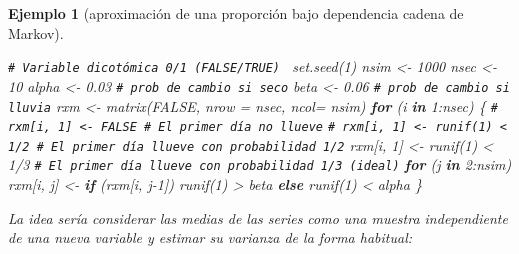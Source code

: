 \documentclass[
  10pt,
]{book}
\newenvironment{Shaded}{\begin{snugshade}}{\end{snugshade}}
\newcommand{\AttributeTok}[1]{\textcolor[rgb]{0.77,0.63,0.00}{#1}}
\newcommand{\CommentTok}[1]{\textcolor[rgb]{0.56,0.35,0.01}{\textit{#1}}}
\newcommand{\ConstantTok}[1]{\textcolor[rgb]{0.00,0.00,0.00}{#1}}
\newcommand{\ControlFlowTok}[1]{\textcolor[rgb]{0.13,0.29,0.53}{\textbf{#1}}}
\newcommand{\DecValTok}[1]{\textcolor[rgb]{0.00,0.00,0.81}{#1}}
\newcommand{\FloatTok}[1]{\textcolor[rgb]{0.00,0.00,0.81}{#1}}
\newcommand{\FunctionTok}[1]{\textcolor[rgb]{0.00,0.00,0.00}{#1}}
\newcommand{\NormalTok}[1]{#1}
\newcommand{\OtherTok}[1]{\textcolor[rgb]{0.56,0.35,0.01}{#1}}
\newcommand{\SpecialCharTok}[1]{\textcolor[rgb]{0.00,0.00,0.00}{#1}}
\theoremstyle{break}
\newtheorem{example}{Ejemplo}[chapter]
\theoremstyle{nonumberplain}
\renewcommand{\CommentTok}[1]{\textcolor[rgb]{0.41,0.41,0.41}{\texttt{#1}}}
\begin{document}
\begin{example}[aproximación de una proporción bajo dependencia cadena de Markov]
\begin{Shaded}
\begin{Highlighting}[]
\CommentTok{\# Variable dicotómica 0/1 (FALSE/TRUE)  }
\FunctionTok{set.seed}\NormalTok{(}\DecValTok{1}\NormalTok{)}
\NormalTok{nsim }\OtherTok{\textless{}{-}} \DecValTok{1000}
\NormalTok{nsec }\OtherTok{\textless{}{-}} \DecValTok{10}
\NormalTok{alpha }\OtherTok{\textless{}{-}} \FloatTok{0.03} \CommentTok{\# prob de cambio si seco}
\NormalTok{beta }\OtherTok{\textless{}{-}} \FloatTok{0.06}  \CommentTok{\# prob de cambio si lluvia}
\NormalTok{rxm }\OtherTok{\textless{}{-}} \FunctionTok{matrix}\NormalTok{(}\ConstantTok{FALSE}\NormalTok{, }\AttributeTok{nrow =}\NormalTok{ nsec, }\AttributeTok{ncol=}\NormalTok{ nsim)}
\ControlFlowTok{for}\NormalTok{ (i }\ControlFlowTok{in} \DecValTok{1}\SpecialCharTok{:}\NormalTok{nsec) \{}
  \CommentTok{\# rxm[i, 1] \textless{}{-} FALSE \# El primer día no llueve}
  \CommentTok{\# rxm[i, 1] \textless{}{-} runif(1) \textless{} 1/2 \# El primer día llueve con probabilidad 1/2}
\NormalTok{  rxm[i, }\DecValTok{1}\NormalTok{] }\OtherTok{\textless{}{-}} \FunctionTok{runif}\NormalTok{(}\DecValTok{1}\NormalTok{) }\SpecialCharTok{\textless{}} \DecValTok{1}\SpecialCharTok{/}\DecValTok{3} \CommentTok{\# El primer día llueve con probabilidad 1/3 (ideal)}
  \ControlFlowTok{for}\NormalTok{ (j }\ControlFlowTok{in} \DecValTok{2}\SpecialCharTok{:}\NormalTok{nsim)}
\NormalTok{    rxm[i, j] }\OtherTok{\textless{}{-}} \ControlFlowTok{if}\NormalTok{ (rxm[i, j}\DecValTok{{-}1}\NormalTok{]) }\FunctionTok{runif}\NormalTok{(}\DecValTok{1}\NormalTok{) }\SpecialCharTok{\textgreater{}}\NormalTok{ beta }\ControlFlowTok{else} \FunctionTok{runif}\NormalTok{(}\DecValTok{1}\NormalTok{) }\SpecialCharTok{\textless{}}\NormalTok{ alpha}
\NormalTok{\}}
\end{Highlighting}
\end{Shaded}

La idea sería considerar las medias de las series como una muestra independiente de una nueva variable y estimar su varianza de la forma habitual:


\end{example}
\end{document}
